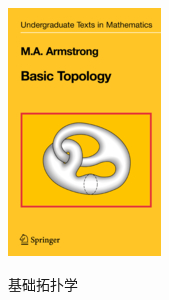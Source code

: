 \documentclass[11pt,A4paper,oneside]{amsart}
\numberwithin{equation}{section}
\theoremstyle{plain}
\theoremstyle{plain}
\numberwithin{equation}{section}
\theoremstyle{remark}
\begin{document}
\begin{figure}[!h]
\begin{minipage}[b]{.27\textwidth}
		\includegraphics[width=.8\textwidth]{figures/BasicTopology.jpg}\\
		\caption{基础拓扑学}
	\end{minipage}
\end{figure}














\end{document}
